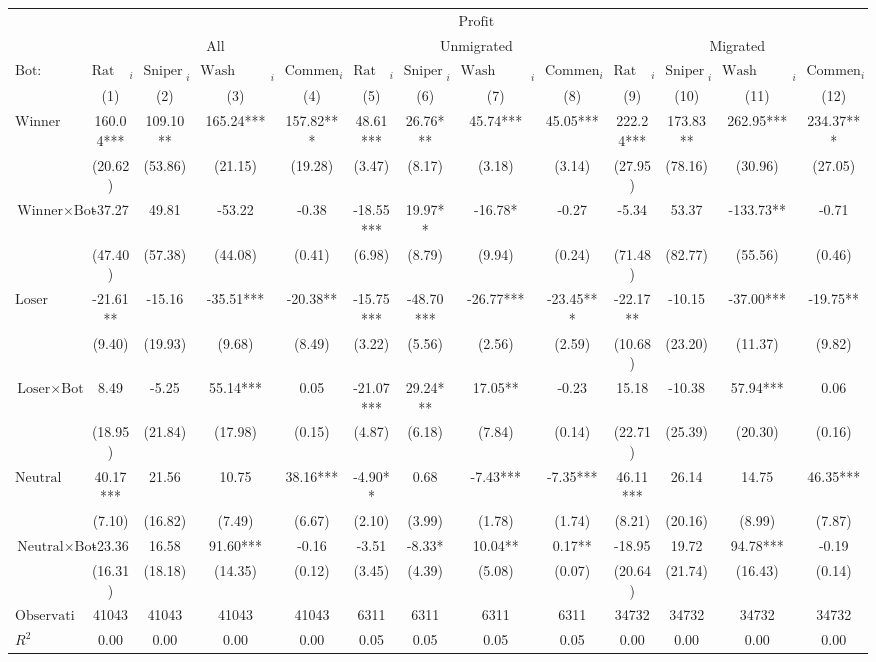 \begin{tabular}{lcccccccccccc}
\hline
 & \multicolumn{12}{c}{$\text{Profit}$} \\
 & \multicolumn{4}{c}{All} & \multicolumn{4}{c}{Unmigrated} & \multicolumn{4}{c}{Migrated} \\
\cmidrule(lr){2-5} \cmidrule(lr){6-9} \cmidrule(lr){10-13}
 $\text{Bot}:$ & $\text{Rat Bot}_{i}$ & $\text{Sniper Bot}_{i}$ & $\text{Wash Trading Bot}_{i}$ & $\text{Comment Bot}_{i}$ & $\text{Rat Bot}_{i}$ & $\text{Sniper Bot}_{i}$ & $\text{Wash Trading Bot}_{i}$ & $\text{Comment Bot}_{i}$ & $\text{Rat Bot}_{i}$ & $\text{Sniper Bot}_{i}$ & $\text{Wash Trading Bot}_{i}$ & $\text{Comment Bot}_{i}$ \\
 & (1) & (2) & (3) & (4) & (5) & (6) & (7) & (8) & (9) & (10) & (11) & (12)\\
\hline
$\text{Winner}$ & 160.04*** & 109.10** & 165.24*** & 157.82*** & 48.61*** & 26.76*** & 45.74*** & 45.05*** & 222.24*** & 173.83** & 262.95*** & 234.37*** \\
 & (20.62) & (53.86) & (21.15) & (19.28) & (3.47) & (8.17) & (3.18) & (3.14) & (27.95) & (78.16) & (30.96) & (27.05) \\
$\text{Winner} \times \text{Bot}$ & -37.27 & 49.81 & -53.22 & -0.38 & -18.55*** & 19.97** & -16.78* & -0.27 & -5.34 & 53.37 & -133.73** & -0.71 \\
 & (47.40) & (57.38) & (44.08) & (0.41) & (6.98) & (8.79) & (9.94) & (0.24) & (71.48) & (82.77) & (55.56) & (0.46) \\
$\text{Loser}$ & -21.61** & -15.16 & -35.51*** & -20.38** & -15.75*** & -48.70*** & -26.77*** & -23.45*** & -22.17** & -10.15 & -37.00*** & -19.75** \\
 & (9.40) & (19.93) & (9.68) & (8.49) & (3.22) & (5.56) & (2.56) & (2.59) & (10.68) & (23.20) & (11.37) & (9.82) \\
$\text{Loser} \times \text{Bot}$ & 8.49 & -5.25 & 55.14*** & 0.05 & -21.07*** & 29.24*** & 17.05** & -0.23 & 15.18 & -10.38 & 57.94*** & 0.06 \\
 & (18.95) & (21.84) & (17.98) & (0.15) & (4.87) & (6.18) & (7.84) & (0.14) & (22.71) & (25.39) & (20.30) & (0.16) \\
$\text{Neutral}$ & 40.17*** & 21.56 & 10.75 & 38.16*** & -4.90** & 0.68 & -7.43*** & -7.35*** & 46.11*** & 26.14 & 14.75 & 46.35*** \\
 & (7.10) & (16.82) & (7.49) & (6.67) & (2.10) & (3.99) & (1.78) & (1.74) & (8.21) & (20.16) & (8.99) & (7.87) \\
$\text{Neutral} \times \text{Bot}$ & -23.36 & 16.58 & 91.60*** & -0.16 & -3.51 & -8.33* & 10.04** & 0.17** & -18.95 & 19.72 & 94.78*** & -0.19 \\
 & (16.31) & (18.18) & (14.35) & (0.12) & (3.45) & (4.39) & (5.08) & (0.07) & (20.64) & (21.74) & (16.43) & (0.14) \\
$\text{Observations}$ & 41043 & 41043 & 41043 & 41043 & 6311 & 6311 & 6311 & 6311 & 34732 & 34732 & 34732 & 34732 \\
$R^2$ & 0.00 & 0.00 & 0.00 & 0.00 & 0.05 & 0.05 & 0.05 & 0.05 & 0.00 & 0.00 & 0.00 & 0.00 \\
\hline
\end{tabular}